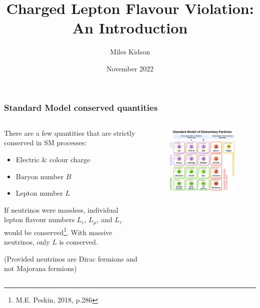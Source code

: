 \documentclass[11pt]{beamer}
\title[Charged Lepton Flavour Violation]{Charged Lepton Flavour Violation: \\ An Introduction} %
\author[Miles Kidson]{Miles Kidson} %
\institute[UCT]{University of Cape Town \\ \smallskip \textit{kdsmil001@myuct.ac.za}} %
\date[November 2022]{November 2022} %
\begin{document}
\frame[plain]{\titlepage}

\begin{frame}
    \frametitle{Standard Model conserved quantities}
    \begin{columns}[c]
        \begin{column}{0.6\textwidth}
            There are a few quantities that are strictly conserved in SM processes:
            \bigskip
            \begin{itemize}
                \item Electric \& colour charge
                \item Baryon number $B$
                \item Lepton number $L$
            \end{itemize}
            \bigskip
            If neutrinos were massless, individual lepton flavour numbers $L_e$, $L_\mu$, and $L_\tau$ would be conserved\footnote[frame]{M.E. Peskin, 2018, p.286}. With massive neutrinos, only $L$ is conserved.

            (Provided neutrinos are Dirac fermions and not Majorana fermions)

        \end{column}
        \begin{column}{0.4\textwidth}
            \begin{figure}[h]
                \begin{center}
                    \includegraphics[width=\textwidth]{SM.png}
                \end{center}
            \end{figure}
            
        \end{column}
        
    \end{columns}

    

\end{frame}
\end{document}
